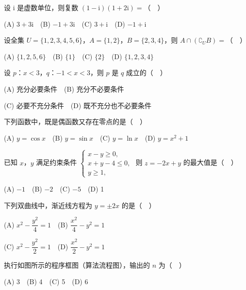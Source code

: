 \begin{question}
设 \(\mathrm{i}\) 是虚数单位，则复数 \((1-\mathrm{i})(1+2\mathrm{i})=\)（　）

(A) \(3+3\mathrm{i}\)　(B) \(-1+3\mathrm{i}\)　(C) \(3+\mathrm{i}\)　(D) \(-1+\mathrm{i}\)

\end{question}
\begin{question}
设全集 \(U=\{1,2,3,4,5,6\}\)，\(A=\{1,2\}\)，\(B=\{2,3,4\}\)，则 \(A\cap(\complement_U B)=\)（　）

(A) \(\{1,2,5,6\}\)　(B) \(\{1\}\)　(C) \(\{2\}\)　(D) \(\{1,2,3,4\}\)

\end{question}
\begin{question}
设 \(p\)：\(x<3\)，\(q\)：\(-1<x<3\)，则 \(p\) 是 \(q\) 成立的（　）

(A) 充分必要条件　(B) 充分不必要条件

(C) 必要不充分条件　(D) 既不充分也不必要条件

\end{question}
\begin{question}
下列函数中，既是偶函数又存在零点的是（　）

(A) \(y=\cos x\)　(B) \(y=\sin x\)　(C) \(y=\ln x\)　(D) \(y=x^2+1\)

\end{question}
\begin{question}
已知 \(x\)，\(y\) 满足约束条件 \(\begin{cases}x-y\geqslant 0,\\x+y-4\leqslant 0,\\y\geqslant 1,\end{cases}\) 则 \(z=-2x+y\) 的最大值是（　）

(A) \(-1\)　(B) \(-2\)　(C) \(-5\)　(D) 1

\end{question}
\begin{question}
下列双曲线中，渐近线方程为 \(y=\pm 2x\) 的是（　）

(A) \(x^2-\dfrac{y^2}{4}=1\)　(B) \(\dfrac{x^2}{4}-y^2=1\)

(C) \(x^2-\dfrac{y^2}{2}=1\)　(D) \(\dfrac{x^2}{2}-y^2=1\)

\Needspace{0.4\textheight}
\end{question}
\begin{question}
执行如图所示的程序框图（算法流程图），输出的 \(n\) 为（　）
\nopagebreak[4]
\begin{center}\end{center}
\nopagebreak[4]
(A) 3　(B) 4　(C) 5　(D) 6

\end{question}
